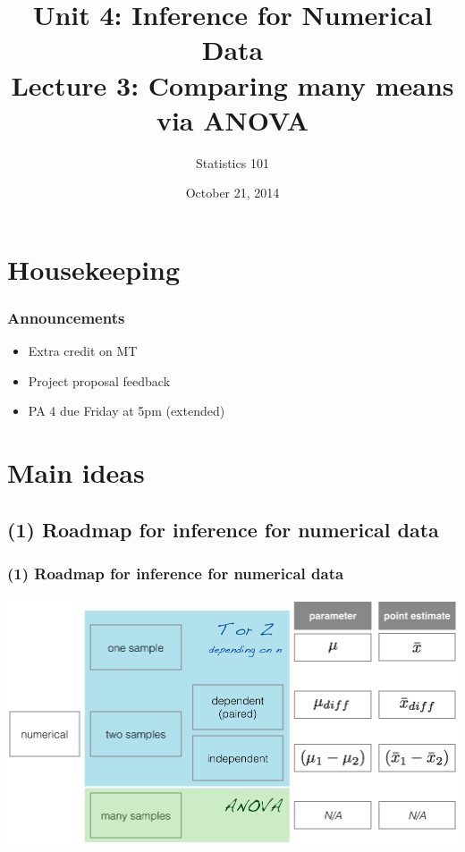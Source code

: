 \documentclass[11pt,containsverbatim,handout]{beamer}
\title[U4 - L3: ANOVA]{Unit 4: Inference for Numerical Data \\ Lecture 3: Comparing many means via ANOVA}
\author{Statistics 101}
\date{October 21, 2014}
\institute{Mine \c{C}etinkaya-Rundel}
\begin{document}


\begin{frame}[plain]

\titlepage

\end{frame}


\section{Housekeeping}


\begin{frame}
\frametitle{Announcements}

\begin{itemize}

\item Extra credit on MT

\item Project proposal feedback

\item PA 4 due Friday at 5pm (extended)

\end{itemize}

\end{frame}


\section{Main ideas}


\subsection{(1) Roadmap for inference for numerical data}


\begin{frame}
\frametitle{(1) Roadmap for inference for numerical data}

\begin{center}
\includegraphics[width=\textwidth]{figures/num_data_inf/num_data_inf}
\end{center}

\end{frame}
\end{document}
